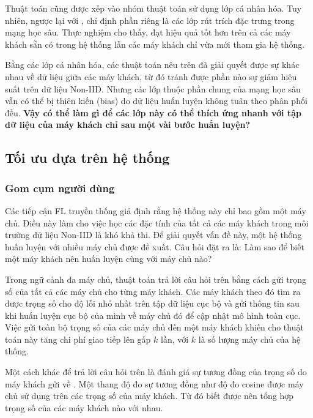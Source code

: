 Thuật toán  \cite{liang2020think} cũng được xếp vào nhóm thuật toán sử dụng lớp cá nhân hóa. Tuy nhiên, ngược lại với ,  chỉ định phần riêng là các lớp rút trích đặc trưng trong mạng học sâu. Thực nghiệm cho thấy,  đạt hiệu quả tốt hơn  trên cả các máy khách sẵn có trong hệ thống lẫn các máy khách chỉ vừa mới tham gia hệ thống.

Bằng các lớp cá nhân hóa, các thuật toán nêu trên đã giải quyết được sự khác nhau về dữ liệu giữa các máy khách, từ đó tránh được phần nào sự giảm hiệu suất trên dữ liệu Non-IID. Nhưng các lớp thuộc phần chung của mạng học sâu vẫn có thể bị thiên kiến (bias) do dữ liệu huấn luyện không tuân theo phân phối đều. \textbf{Vậy có thể làm gì để các lớp này có thể thích ứng nhanh với tập dữ liệu của máy khách chỉ sau một vài bước huấn luyện?}

\subsection{Tối ưu dựa trên hệ thống}

\subsubsection{Gom cụm người dùng}

Các tiếp cận FL truyền thống giả định rằng hệ thống này chỉ bao gồm một máy chủ. Điều này làm cho việc học các đặc tính của tất cả các máy khách trong môi trường dữ liệu Non-IID là khó khả thi. Để giải quyết vấn đề này, một hệ thống huấn luyện với nhiều máy chủ được đề xuất. Câu hỏi đặt ra là: Làm sao để biết một máy khách nên huấn luyện cùng với máy chủ nào? 

Trong ngữ cảnh đa máy chủ, thuật toán  \cite{ghosh2020efficient} trả lời câu hỏi trên bằng cách gửi trọng số của tất cả các máy chủ cho từng máy khách. Các máy khách theo đó tìm ra được trọng số cho độ lỗi nhỏ nhất trên tập dữ liệu cục bộ và gửi thông tin sau khi huấn luyện cục bộ của mình về máy chủ đó để cập nhật mô hình toàn cục. Việc gửi toàn bộ trọng số của các máy chủ đến một máy khách khiến cho thuật toán này tăng chi phí giao tiếp lên gấp $k$ lần, với $k$ là số lượng máy chủ của hệ thống.

Một cách khác để trả lời câu hỏi trên là đánh giá sự tương đồng của trọng số do máy khách gửi về \cite{zhu2021federated}. Một thang độ đo sự tương đồng như độ đo cosine được máy chủ sử dụng trên các trọng số của máy khách. Từ đó biết được nên tổng hợp trọng số của các máy khách nào với nhau.

